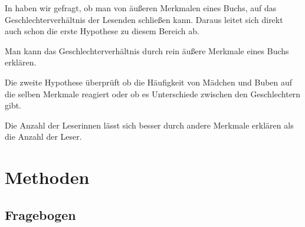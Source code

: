 In  haben wir gefragt, ob man von äußeren Merkmalen
eines Buchs, auf das Geschlechterverhältnis der Lesenden schließen kann.
Daraus leitet sich direkt auch schon die erste Hypothese zu diesem
Bereich ab.

\begin{hyp}
    Man kann das Geschlechterverhältnis durch rein äußere Merkmale eines Buchs erklären.
\end{hyp}

Die zweite Hypothese überprüft ob die Häufigkeit von Mädchen und Buben
auf die selben Merkmale reagiert oder ob es Unterschiede zwischen den
Geschlechtern gibt.

\begin{subhyp}
    Die Anzahl der Leserinnen lässt sich besser durch andere Merkmale erklären als die Anzahl der Leser.
\end{subhyp}

\section{Methoden}

\subsection{Fragebogen}

